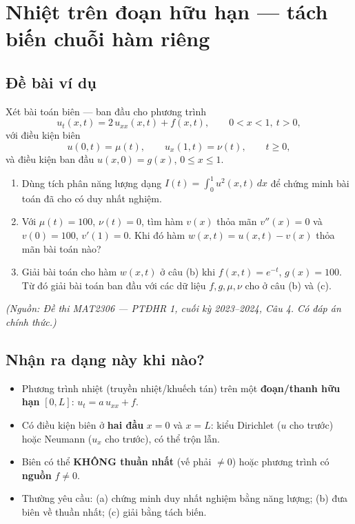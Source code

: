 
\section{Nhiệt trên đoạn hữu hạn --- tách biến chuỗi hàm riêng}

\subsection*{Đề bài ví dụ}

Xét bài toán biên --- ban đầu cho phương trình
\[
u_t(x,t) = 2\,u_{xx}(x,t) + f(x,t), \qquad 0 < x < 1,\ t > 0,
\]
với điều kiện biên
\[
u(0,t) = \mu(t), \qquad u_x(1,t) = \nu(t), \qquad t \ge 0,
\]
và điều kiện ban đầu $u(x,0) = g(x)$, $0 \le x \le 1$.

\begin{enumerate}
\item[(a)] Dùng tích phân năng lượng dạng $I(t) = \int_0^1 u^2(x,t)\,dx$ để chứng minh bài toán đã cho có duy nhất nghiệm.
\item[(b)] Với $\mu(t) = 100$, $\nu(t) = 0$, tìm hàm $v(x)$ thỏa mãn $v''(x) = 0$ và $v(0) = 100$, $v'(1) = 0$. Khi đó hàm $w(x,t) = u(x,t) - v(x)$ thỏa mãn bài toán nào?
\item[(c)] Giải bài toán cho hàm $w(x,t)$ ở câu (b) khi $f(x,t) = e^{-t}$, $g(x) = 100$. Từ đó giải bài toán ban đầu với các dữ liệu $f, g, \mu, \nu$ cho ở câu (b) và (c).
\end{enumerate}

\emph{\small(Nguồn: Đề thi MAT2306 --- PTĐHR 1, cuối kỳ 2023--2024, Câu 4. Có đáp án chính thức.)}

\subsection*{Nhận ra dạng này khi nào?}

\begin{itemize}
\item Phương trình nhiệt (truyền nhiệt/khuếch tán) trên một \textbf{đoạn/thanh hữu hạn} $[0,L]$: $u_t = a\,u_{xx} + f$.
\item Có điều kiện biên ở \textbf{hai đầu} $x=0$ và $x=L$: kiểu Dirichlet ($u$ cho trước) hoặc Neumann ($u_x$ cho trước), có thể trộn lẫn.
\item Biên có thể \textbf{KHÔNG thuần nhất} (vế phải $\ne 0$) hoặc phương trình có \textbf{nguồn} $f \ne 0$.
\item Thường yêu cầu: (a) chứng minh duy nhất nghiệm bằng năng lượng; (b) đưa biên về thuần nhất; (c) giải bằng tách biến.
\end{itemize}

